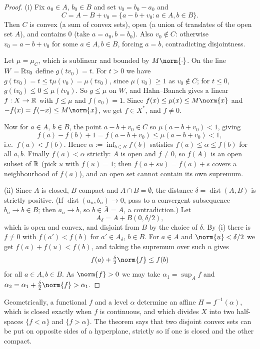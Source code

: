 \documentclass[a4paper]{scrartcl}
\DeclareMathOperator{\dist}{dist}
\begin{document}
\begin{proof}
	(i) Fix $a_0 \in A$, $b_0 \in B$ and set $v_0 = b_0 - a_0$ and
	$$C = A - B + v_0 = \{a - b + v_0 : a \in A, b \in B\}.$$
	Then $C$ is convex (a sum of convex sets), open (a union of translates of the open set $A$), and contains $0$ (take $a = a_0, b = b_0$). Also $v_0 \notin C$: otherwise $v_0 = a - b + v_0$ for some $a \in A, b\in B$, forcing $a = b$, contradicting disjointness.

	Let $\mu = \mu_C$, which is sublinear and bounded by $M\norm{\cdot}$. On the line $W = \mathbb{R} v_0$ define $g(t v_0) = t$. For $t > 0$ we have $g(tv_0) = t \leq t\mu(v_0) = \mu(tv_0)$, since $\mu(v_0) \geq 1$ as $v_0 \notin C$; for $t \leq 0$, $g(tv_0) \leq 0 \leq \mu(tv_0)$. So $g \leq \mu$ on $W$, and Hahn--Banach gives a linear $f : X \to \mathbb{R}$ with $f \leq \mu$ and $f(v_0) = 1$. Since $f(x) \leq \mu(x) \leq M\norm{x}$ and $-f(x) = f(-x) \leq M\norm{x}$, we get $f \in X^*$, and $f \neq 0$.

	Now for $a \in A$, $b \in B$, the point $a - b + v_0 \in C$ so $\mu(a - b + v_0) < 1$, giving
	$$f(a) - f(b) + 1 = f(a - b + v_0) \leq \mu(a-b+v_0) < 1,$$
	i.e.\ $f(a) < f(b)$. Hence $\alpha := \inf_{b \in B} f(b)$ satisfies $f(a) \leq \alpha \leq f(b)$ for all $a, b$. Finally $f(a) < \alpha$ strictly: $A$ is open and $f \neq 0$, so $f(A)$ is an open subset of $\mathbb{R}$ (pick $u$ with $f(u) = 1$; then $f(a + su) = f(a) + s$ covers a neighbourhood of $f(a)$), and an open set cannot contain its own supremum.

	(ii) Since $A$ is closed, $B$ compact and $A \cap B = \emptyset$, the distance $\delta = \dist(A,B)$ is strictly positive. (If $\dist(a_n,b_n) \to 0$, pass to a convergent subsequence $b_n \to b \in B$; then $a_n \to b$, so $b \in \bar A = A$, a contradiction.) Let
	$$A_\delta = A + B(0, \delta/2),$$
	which is open and convex, and disjoint from $B$ by the choice of $\delta$. By (i) there is $f \neq 0$ with $f(a') < f(b)$ for $a' \in A_\delta$, $b \in B$. For $a \in A$ and $\norm{u} < \delta/2$ we get $f(a) + f(u) < f(b)$, and taking the supremum over such $u$ gives
	$$f(a) + \tfrac{\delta}{2}\norm{f} \leq f(b)$$
	for all $a \in A, b \in B$. As $\norm{f} > 0$ we may take $\alpha_1 = \sup_A f$ and $\alpha_2 = \alpha_1 + \frac{\delta}{2}\norm{f} > \alpha_1$.
\end{proof}

Geometrically, a functional $f$ and a level $\alpha$ determine an affine  $H = f^{-1}(\alpha)$, which is closed exactly when $f$ is continuous, and which divides $X$ into two half-spaces $\{f < \alpha\}$ and $\{f > \alpha\}$. The theorem says that two disjoint convex sets can be put on opposite sides of a hyperplane, strictly so if one is closed and the other compact.
\end{document}
